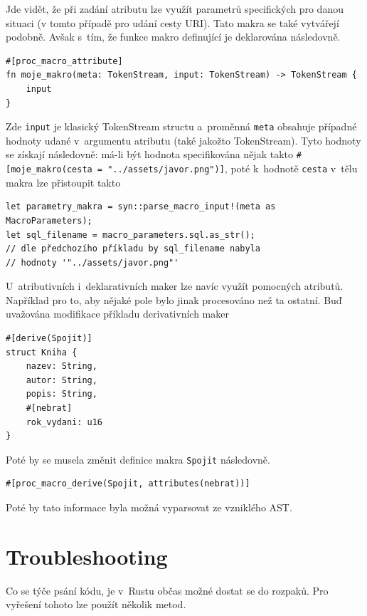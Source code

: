 \documentclass[a4paper, 12pt]{article} %
\newcommand{\rust}[1]{\texttt{#1}}
\begin{document}
            Jde vidět, že při zadání atributu lze využít parametrů specifických pro danou situaci (v tomto případě pro udání cesty URI). Tato makra se také vytvářejí podobně. Avšak s~tím, že funkce makro definující je deklarována následovně.
            \begin{verbatim}
#[proc_macro_attribute]
fn moje_makro(meta: TokenStream, input: TokenStream) -> TokenStream {
    input
} 
            \end{verbatim}
            
            Zde \rust{input} je klasický TokenStream structu a~proměnná \rust{meta} obsahuje případné hodnoty udané v~argumentu atributu (také jakožto TokenStream). Tyto hodnoty se získají následovně: má-li být hodnota specifikována nějak takto \linebreak\texttt{\#[moje\_makro(cesta = "../assets/javor.png")]}, poté k~hodnotě \rust{cesta} v~tělu makra lze přistoupit takto
            \begin{verbatim}
let parametry_makra = syn::parse_macro_input!(meta as MacroParameters);
let sql_filename = macro_parameters.sql.as_str();
// dle předchozího příkladu by sql_filename nabyla
// hodnoty '"../assets/javor.png"'
            \end{verbatim}
            \cite{atrib_makro}
            
            U~atributivních i~deklarativních maker lze navíc využít pomocných atributů. Například pro to, aby nějaké pole bylo jinak procesováno než ta ostatní. Buď uvažována modifikace příkladu derivativních maker
            \begin{verbatim}
#[derive(Spojit)]
struct Kniha {
    nazev: String,
    autor: String,
    popis: String,
    #[nebrat]
    rok_vydani: u16
}
            \end{verbatim}
            
            
            Poté by se musela změnit definice makra \texttt{Spojit} následovně.
            \begin{verbatim}
#[proc_macro_derive(Spojit, attributes(nebrat))]
            \end{verbatim}
            
            Poté by tato informace byla možná vyparsovat ze vzniklého AST.\cite{atrib_makro}


\section{Troubleshooting}
    Co se týče psání kódu, je v~Rustu občas možné dostat se do rozpaků. Pro vyřešení tohoto lze použít několik metod.
\end{document}

